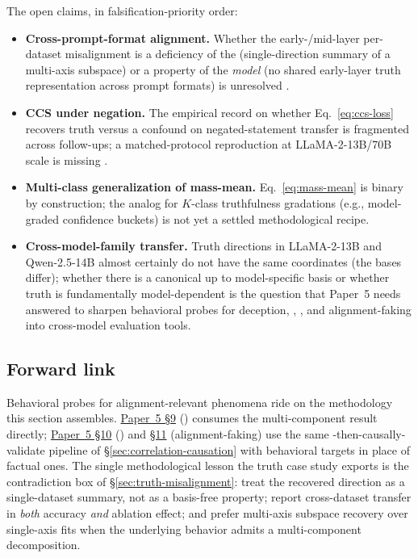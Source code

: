 The open claims, in falsification-priority order:
\begin{itemize}
  \item \textbf{Cross-prompt-format alignment.} Whether the
    early-/mid-layer per-dataset misalignment is a deficiency of the
    \emph{} (single-direction summary of a multi-axis subspace)
    or a property of the \emph{model} (no shared early-layer truth
    representation across prompt formats) is unresolved
    \citep[\S 4]{marks-tegmark-2023-truth}.
  \item \textbf{CCS under negation.} The empirical record on whether
    Eq.~\eqref{eq:ccs-loss} recovers truth versus a confound on
    negated-statement transfer is fragmented across follow-ups; a
    matched-protocol reproduction at LLaMA-2-13B/70B scale is missing
    .
  \item \textbf{Multi-class generalization of mass-mean.}
    Eq.~\eqref{eq:mass-mean} is binary by construction; the analog
    for $K$-class truthfulness gradations (e.g., model-graded
    confidence buckets) is not yet a settled methodological recipe.
  \item \textbf{Cross-model-family transfer.} Truth directions in
    LLaMA-2-13B and Qwen-2.5-14B almost certainly do not have the
    same coordinates (the bases differ); whether there is a
    canonical  up to model-specific basis or whether
    truth is fundamentally model-dependent is the question that
    Paper~5 needs answered to sharpen behavioral probes for
    deception, , , and alignment-faking into
    cross-model evaluation tools.
\end{itemize}

\subsection{Forward link}
\label{sec:truth-forward}

Behavioral probes for alignment-relevant phenomena ride on the
methodology this section assembles. \hyperref[P5-sec:sycophancy]{Paper~5 §9} ()
consumes the
\citeauthor{vennemeyer2025-sycophancy-not-one-thing} multi-component
result directly; \hyperref[P5-sec:scheming]{Paper~5 §10} () and \hyperref[P5-sec:alignment-faking]{§11} (alignment-faking) use
the same -then-causally-validate pipeline of
\S\ref{sec:correlation-causation} with behavioral targets in place of
factual ones. The single methodological lesson the truth case study
exports is the contradiction box of \S\ref{sec:truth-misalignment}:
treat the recovered direction as a single-dataset summary, not as a
basis-free property; report cross-dataset transfer in
\emph{both} accuracy \emph{and} ablation effect; and prefer multi-axis
subspace recovery over single-axis fits when the underlying behavior
admits a multi-component decomposition.

